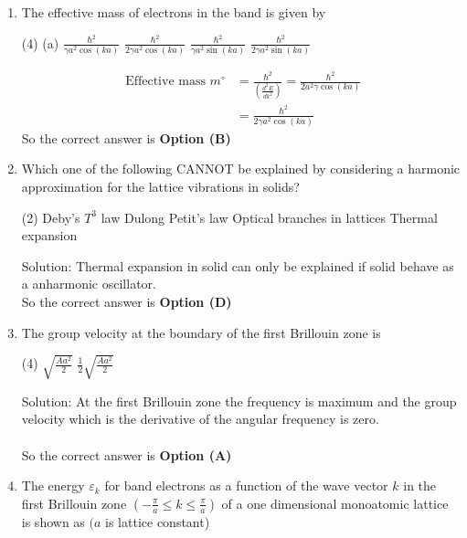 \begin{enumerate}
	\item The effective mass of electrons in the band is given by
{	}
\begin{tasks}(4)
\task[\textbf{A.}] (a) $\frac{\hbar^{2}}{\gamma a^{2} \cos (k a)}$
\task[\textbf{B.}] $\frac{\hbar^{2}}{2 \gamma a^{2} \cos (k a)}$
\task[\textbf{C.}] $\frac{\hbar^{2}}{\gamma a^{2} \sin (k a)}$
\task[\textbf{D.}] $\frac{\hbar^{2}}{2 \gamma a^{2} \sin (k a)}$
\end{tasks}
\begin{answer}
\begin{align*}
\text{	Effective mass }m^{\circ}&=\frac{\hbar^{2}}{\left(\frac{d^{2} E}{d k^{2}}\right)}=\frac{\hbar^{2}}{2 a^{2} \gamma \cos (k a)}\\&=\frac{\hbar^{2}}{2 \gamma a^{2} \cos (k a)}
\end{align*}
So the correct answer is \textbf{Option (B)}
\end{answer}
	\item Which one of the following CANNOT be explained by considering a harmonic approximation for the lattice vibrations in solids?
{	}
\begin{tasks}(2)
\task[\textbf{A.}] Deby's $T^{3}$ law
\task[\textbf{B.}] Dulong Petit's law
\task[\textbf{C.}] Optical branches in lattices
\task[\textbf{D.}]  Thermal expansion
\end{tasks}
\begin{answer}
Solution: Thermal expansion in solid can only be explained if solid behave as a anharmonic oscillator.\\
So the correct answer is \textbf{Option (D)}
\end{answer}
	\item The group velocity at the boundary of the first Brillouin zone is
{	}
\begin{tasks}(4)
\task[\textbf{C.}] $\sqrt{\frac{A a^{2}}{2}}$
\task[\textbf{D.}] $\frac{1}{2} \sqrt{\frac{A a^{2}}{2}}$
\end{tasks}
\begin{answer}
Solution: At the first Brillouin zone the frequency is maximum and the group velocity which is the derivative of the angular frequency is zero.\\\\
So the correct answer is \textbf{Option (A)}
\end{answer}
	\item The energy $\varepsilon_{k}$ for band electrons as a function of the wave vector $k$ in the first Brillouin zone $\left(-\frac{\pi}{a} \leq k \leq \frac{\pi}{a}\right)$ of a one dimensional monoatomic lattice is shown as $(a$ is lattice constant)\\

\end{enumerate}
